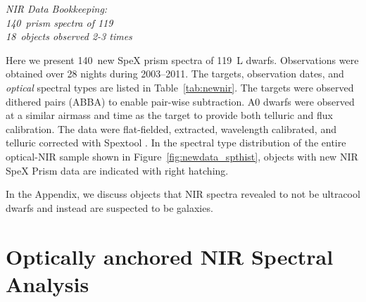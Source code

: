\documentclass[12pt,preprint]{aastex}
\newcommand{\prismspectra}{140} %
\newcommand{\dupes}{18} %
\newcommand{\objects}{119} %
\begin{document}
\label{sec:obs_new_nir}

\emph{NIR Data Bookkeeping: \\
\prismspectra~prism spectra of \objects \\
\dupes~objects observed 2-3 times}

Here we present \prismspectra~new SpeX prism spectra of \objects~L dwarfs. 
Observations were obtained over 28 nights during 2003--2011. The targets, observation dates, and \emph{optical} spectral types are listed in Table~\ref{tab:newnir}. 
The targets were observed dithered pairs (ABBA) to enable pair-wise subtraction. A0 dwarfs were observed at a similar airmass and time as the target to provide both telluric and flux calibration.
The data were flat-fielded, extracted, wavelength calibrated, and telluric corrected with Spextool \citep{Cushing04,Spextool2}.
In the spectral type distribution of the entire optical-NIR sample shown in Figure~\ref{fig:newdata_spthist}, objects with new NIR SpeX Prism data are indicated with right hatching.

In the Appendix, we discuss objects that NIR spectra revealed to not be ultracool dwarfs and instead are suspected to be galaxies.


\clearpage
\section{Optically anchored NIR Spectral Analysis}
\end{document}
